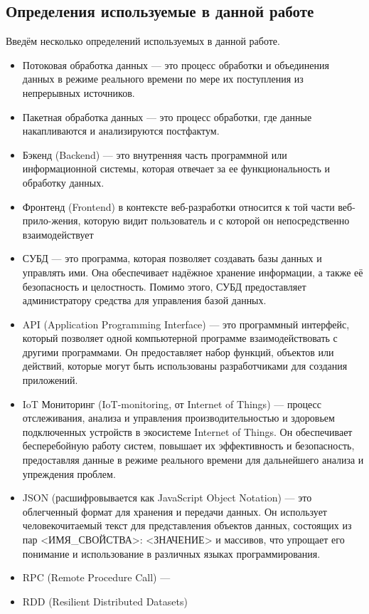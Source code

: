     \subsection{Определения используемые в данной работе}
        Введём несколько определений используемых в данной работе.
        \begin{itemize}
            \item Потоковая обработка данных — это процесс обработки и объединения данных в режиме реального времени по мере их поступления из непрерывных источников.
            \item Пакетная обработка данных — это процесс обработки, где данные накапливаются и анализируются постфактум.
            \item Бэкенд (Backend) — это внутренняя часть программной или информационной системы, которая отвечает за ее функциональность и обработку данных. 
            \item Фронтенд (Frontend) в контексте веб-разработки относится к той части веб-прило-жения, которую видит пользователь и с которой он непосредственно взаимодействует
            \item СУБД — это программа, которая позволяет создавать базы данных и управлять ими. Она обеспечивает надёжное хранение информации, а также её безопасность и целостность. Помимо этого, СУБД предоставляет администратору средства для управления базой данных.
            \item API (Application Programming Interface) — это программный интерфейс, который позволяет одной компьютерной программе взаимодействовать с другими программами. Он предоставляет набор функций, объектов или действий, которые могут быть использованы разработчиками для создания приложений.
            \item IoT Мониторинг (IoT-monitoring, от Internet of Things) — процесс отслеживания, анализа и управления производительностью и здоровьем подключенных устройств в экосистеме Internet of Things. Он обеспечивает бесперебойную работу систем, повышает их эффективность и безопасность, предоставляя данные в режиме реального времени для дальнейшего анализа и упреждения проблем.
            \item JSON (расшифровывается как JavaScript Object Notation) — это облегченный формат для хранения и передачи данных. Он использует человекочитаемый текст для представления объектов данных, состоящих из пар <ИМЯ\_СВОЙСТВА>: <ЗНАЧЕНИЕ> и массивов, что упрощает его понимание и использование в различных языках программирования.
            \item RPC (Remote Procedure Call) —
            \item RDD (Resilient Distributed Datasets)
        \end{itemize}

